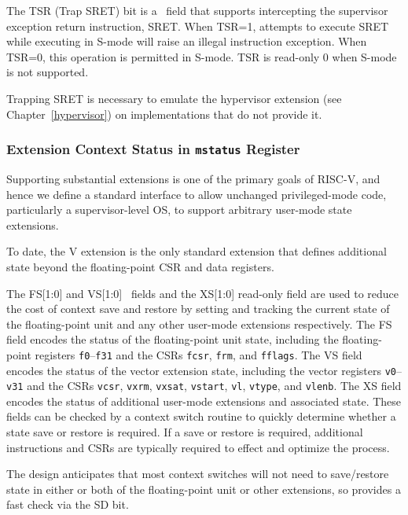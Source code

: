 The TSR (Trap SRET) bit is a \warl\ field that
supports intercepting the supervisor exception return
instruction, SRET.  When TSR=1, attempts to execute SRET while executing in
S-mode will raise an illegal instruction exception.  When TSR=0, this
operation is permitted in S-mode.  TSR is read-only 0 when S-mode is not
supported.

\begin{commentary}
Trapping SRET is necessary to emulate the hypervisor extension
(see Chapter~\ref{hypervisor}) on implementations that do not provide it.
\end{commentary}

\subsubsection{Extension Context Status in {\tt mstatus} Register}

Supporting substantial extensions is one of the primary goals of
RISC-V, and hence we define a standard interface to allow unchanged
privileged-mode code, particularly a supervisor-level OS, to support
arbitrary user-mode state extensions.

\begin{commentary}
  To date, the V extension is the only standard extension that defines
  additional state beyond the floating-point CSR and data registers.
\end{commentary}

The FS[1:0] and VS[1:0] \warl\ fields and the XS[1:0] read-only field are used
to reduce the cost of context save and restore by setting and tracking
the current state of the floating-point unit and any other user-mode
extensions respectively.
The FS field encodes the status of the floating-point unit state, including
the floating-point registers {\tt f0}--{\tt f31} and the CSRs
{\tt fcsr}, {\tt frm}, and {\tt fflags}.
The VS field encodes the status of the vector extension state, including
the vector registers {\tt v0}--{\tt v31} and the CSRs
{\tt vcsr}, {\tt vxrm}, {\tt vxsat}, {\tt vstart}, {\tt vl}, {\tt vtype},
and {\tt vlenb}.
The XS field encodes the
status of additional user-mode extensions and associated state.
These fields can be checked by a context switch routine to quickly
determine whether a state save or restore is required.  If a save or
restore is required, additional instructions and CSRs are typically
required to effect and optimize the process.

\begin{commentary}
  The design anticipates that most context switches will not need to
  save/restore state in either or both of the floating-point unit or
  other extensions, so provides a fast check via the SD bit.
\end{commentary}

